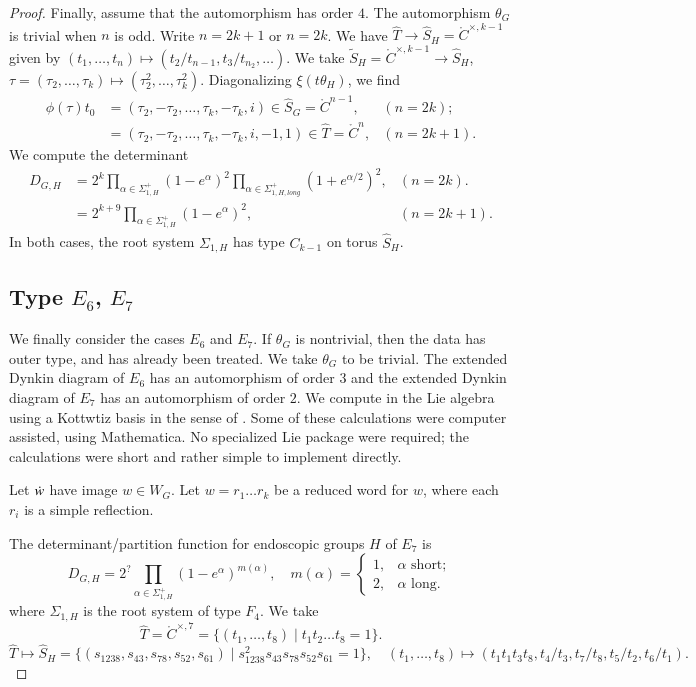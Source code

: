 \begin{proof}
Finally, assume that the automorphism has order $4$.
The automorphism $\theta_G$ is trivial when $n$ is odd.
Write $n=2k+1$ or $n=2k$.
We have $\hat T\to \hat S_H = \ring{C}^{\times,k-1}$ given by
$(t_1,\ldots,t_n)\mapsto (t_2/t_{n-1},t_3/t_{n_2},\ldots)$.
We take $\tilde S_H =\ring{C}^{\times,k-1}\to \hat S_H$, $\tau = (\tau_2,\ldots,\tau_k)\mapsto (\tau_2^2,\ldots,\tau_k^2)$.
Diagonalizing $\xi(t\theta_H)$, we find
\begin{align*}
\phi(\tau)t_0 &= (\tau_2,-\tau_2,\ldots,\tau_k,-\tau_k,i)\in \hat S_G=\ring{C}^{n-1},&(n=2k);\\
&= (\tau_2,-\tau_2,\ldots,\tau_k,-\tau_k,i,-1,1)\in \hat T = \ring{C}^n,&(n=2k+1).
\end{align*}
We compute the determinant
\begin{align*}
D_{G,H} &= 2^k \prod_{\alpha\in \Sigma^+_{1,H}} (1-e^\alpha)^2 \prod_{\alpha\in \Sigma^+_{1,H,long}} (1+e^{\alpha/2})^2,&(n=2k).\\
          &= 2^{k+9} \prod_{\alpha\in\Sigma^+_{1,H}} (1-e^\alpha)^2,&(n=2k+1).
\end{align*}
In both cases, the root system $\Sigma_{1,H}$ has type $C_{k-1}$ on torus $\hat S_H$.


\subsection{Type $E_6$, $E_7$}

We finally consider the cases $E_6$ and $E_7$.  If $\theta_G$ is nontrivial, then the data has outer type,
and has already been treated.  We take $\theta_G$ to be trivial.   The extended Dynkin diagram of $E_6$
has an automorphism of order $3$ and the extended Dynkin diagram of $E_7$ has an automorphism of order $2$.
We compute in the Lie algebra using a Kottwtiz basis in the sense of \cite{cass-structure}. Some of these calculations were 
computer assisted, using Mathematica.  No specialized Lie package were required; the calculations were short and rather simple
to implement directly.

Let $\dot w$ have image $w\in W_G$.  Let $w=r_1\ldots r_k$ be  a reduced word for $w$, where each $r_i$ is a simple reflection.



The determinant/partition function for endoscopic groups $H$ of $E_7$ is
\[
D_{G,H} = 2^{\text{?}} \prod_{\alpha\in \Sigma^+_{1,H}} (1-e^\alpha)^{m(\alpha)},\quad 
m(\alpha)= \begin{cases}1,&\alpha \text{ short};\\2,&\alpha \text{ long}.\end{cases}
\]
where $\Sigma_{1,H}$ is the root system of type $F_4$.
We take 
\[
\hat T = \ring{C}^{\times,7} = \{ (t_1,\ldots,t_8)\mid t_1 t_2\ldots t_8= 1\}.
\]
\[
\hat T\mapsto \hat S_H = \{(s_{1238},s_{43},s_{78},s_{52},s_{61})\mid s_{1238}^2 s_{43} s_{78} s_{52} s_{61}=1\},\quad
(t_1,\ldots,t_8)\mapsto (t_1t_1t_3t_8,t_4/t_3,t_7/t_8,t_5/t_2,t_6/t_1).
\]



\end{proof}



